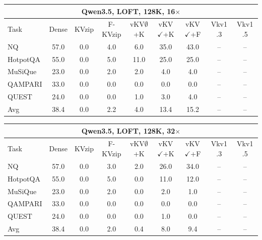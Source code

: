 \begin{tabular}{lcccccccc}
\toprule
\multicolumn{9}{c}{Qwen3.5, LOFT, 128K, 16$\times$} \\
\midrule
Task & Dense & KVzip & F-KVzip & vKV$\emptyset$+K & vKV$\checkmark$+K & vKV$\checkmark$+F & Vkv1 .3 & Vkv1 .5 \\
\midrule
NQ & 57.0 & 0.0 & 4.0 & 6.0 & 35.0 & 43.0 & -- & -- \\
HotpotQA & 55.0 & 0.0 & 5.0 & 11.0 & 25.0 & 25.0 & -- & -- \\
MuSiQue & 23.0 & 0.0 & 2.0 & 2.0 & 4.0 & 4.0 & -- & -- \\
QAMPARI & 33.0 & 0.0 & 0.0 & 0.0 & 0.0 & 0.0 & -- & -- \\
QUEST & 24.0 & 0.0 & 0.0 & 1.0 & 3.0 & 4.0 & -- & -- \\
\midrule
Avg & 38.4 & 0.0 & 2.2 & 4.0 & 13.4 & 15.2 & -- & -- \\
\bottomrule
\end{tabular}
\vspace{0.8em}

\begin{tabular}{lcccccccc}
\toprule
\multicolumn{9}{c}{Qwen3.5, LOFT, 128K, 32$\times$} \\
\midrule
Task & Dense & KVzip & F-KVzip & vKV$\emptyset$+K & vKV$\checkmark$+K & vKV$\checkmark$+F & Vkv1 .3 & Vkv1 .5 \\
\midrule
NQ & 57.0 & 0.0 & 3.0 & 2.0 & 26.0 & 34.0 & -- & -- \\
HotpotQA & 55.0 & 0.0 & 5.0 & 0.0 & 11.0 & 12.0 & -- & -- \\
MuSiQue & 23.0 & 0.0 & 2.0 & 0.0 & 2.0 & 1.0 & -- & -- \\
QAMPARI & 33.0 & 0.0 & 0.0 & 0.0 & 0.0 & 0.0 & -- & -- \\
QUEST & 24.0 & 0.0 & 0.0 & 0.0 & 1.0 & 0.0 & -- & -- \\
\midrule
Avg & 38.4 & 0.0 & 2.0 & 0.4 & 8.0 & 9.4 & -- & -- \\
\bottomrule
\end{tabular}
\vspace{0.8em}

